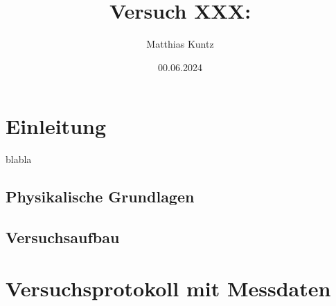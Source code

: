 \documentclass{article}
\title{Versuch XXX: }
\author{Matthias Kuntz}
\date{00.06.2024}
\begin{document}
\maketitle

\tableofcontents

\newpage

\section{Einleitung}

blabla


\subsection{Physikalische Grundlagen}


\newpage
\subsection{Versuchsaufbau}




\phantom{.}





\newpage

\section{Versuchsprotokoll mit Messdaten}
\end{document}
